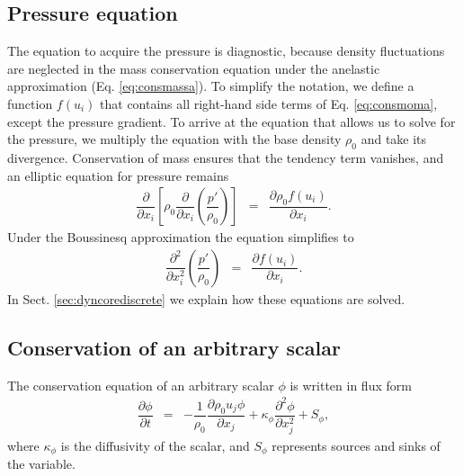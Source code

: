 \documentclass[gmd,manuscript]{copernicus}
\begin{document}
\subsection{Pressure equation}
The equation to acquire the pressure is diagnostic, because density fluctuations are neglected in the mass conservation equation under the anelastic approximation (Eq. \ref{eq:consmassa}). To simplify the notation, we define a function $f \left( u_i \right)$ that contains all right-hand side terms of Eq. \ref{eq:consmoma}, except the pressure gradient. To arrive at the equation that allows us to solve for the pressure, we multiply the equation with the base density $\rho_0$ and take its divergence. Conservation of mass ensures that the tendency term vanishes, and an elliptic equation for pressure remains
\begin{eqnarray}
\dfrac{\partial}{\partial x_i} 
\left[ \rho_0 \dfrac{\partial}{\partial x_i} \left( \dfrac{p'}{\rho_0} \right) \right] & = &
\dfrac{\partial \rho_0 f \left( u_i \right)}{\partial x_i}.\label{eq:presa}
\end{eqnarray}
Under the Boussinesq approximation the equation simplifies to
\begin{eqnarray}
\dfrac{\partial^2}{\partial x_i^2} \left( \dfrac{p'}{\rho_0} \right) & = &
\dfrac{\partial f \left( u_i \right)}{\partial x_i}.\label{eq:presb}
\end{eqnarray}
In Sect. \ref{sec:dyncorediscrete} we explain how these equations are solved.

\subsection{Conservation of an arbitrary scalar}
The conservation equation of an arbitrary scalar $\phi$ is written in flux form
\begin{eqnarray}
\dfrac{\partial \phi}{\partial t} & = & - \dfrac{1}{\rho_0} \dfrac{\partial \rho_0 u_j \phi}{\partial x_j} +
\kappa_\phi \dfrac{\partial^2 \phi}{\partial x_j^2} + S_\phi, \label{eq:consscal}
\end{eqnarray}
where $\kappa_\phi$ is the diffusivity of the scalar, and $S_\phi$ represents sources and sinks of the variable.
\end{document}
